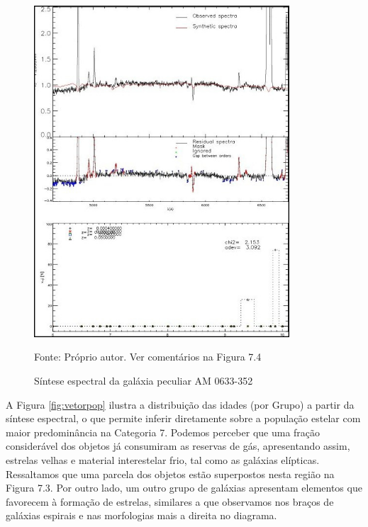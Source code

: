 \begin{figure}[H]
\centering	
\caption{Síntese espectral da galáxia peculiar AM 0633-352}
\includegraphics[width=0.85\textwidth]{figuras/ativas.jpg}
\begin{center}
   \normalsize Fonte: Próprio autor. Ver comentários na Figura 7.4
    \end{center}
\label{fig:ativas}
\end{figure}

A Figura \ref{fig:vetorpop} ilustra a distribuição das idades (por Grupo) a partir da síntese espectral, o que permite inferir diretamente sobre a população estelar com maior predominância na Categoria 7. Podemos perceber que uma fração considerável dos objetos já consumiram as reservas de gás, apresentando assim, estrelas velhas e material interestelar frio, tal como as galáxias
elípticas. Ressaltamos que uma parcela dos objetos estão superpostos nesta região na Figura 7.3. Por outro lado, um outro grupo de galáxias apresentam elementos que favorecem à formação de estrelas, similares a que observamos
nos braços de galáxias espirais e nas morfologias mais a direita no diagrama. 


